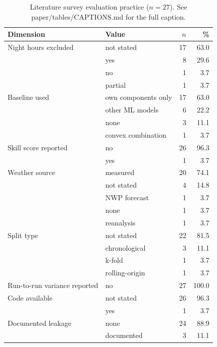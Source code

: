 \begin{table}[t]
  \centering
  \small
  \caption{Literature survey evaluation practice ($n=27$). See paper/tables/CAPTIONS.md for the full caption.}
  \label{tab:survey}
  \begin{tabular}{llrr}
    \toprule
    Dimension & Value & $n$ & \% \\
    \midrule
    Night hours excluded & not stated & 17 & 63.0 \\
     & yes & 8 & 29.6 \\
     & no & 1 & 3.7 \\
     & partial & 1 & 3.7 \\
    \addlinespace
    Baseline used & own components only & 17 & 63.0 \\
     & other ML models & 6 & 22.2 \\
     & none & 3 & 11.1 \\
     & convex combination & 1 & 3.7 \\
    \addlinespace
    Skill score reported & no & 26 & 96.3 \\
     & yes & 1 & 3.7 \\
    \addlinespace
    Weather source & measured & 20 & 74.1 \\
     & not stated & 4 & 14.8 \\
     & NWP forecast & 1 & 3.7 \\
     & none & 1 & 3.7 \\
     & reanalysis & 1 & 3.7 \\
    \addlinespace
    Split type & not stated & 22 & 81.5 \\
     & chronological & 3 & 11.1 \\
     & k-fold & 1 & 3.7 \\
     & rolling-origin & 1 & 3.7 \\
    \addlinespace
    Run-to-run variance reported & no & 27 & 100.0 \\
    \addlinespace
    Code available & not stated & 26 & 96.3 \\
     & yes & 1 & 3.7 \\
    \addlinespace
    Documented leakage & none & 24 & 88.9 \\
     & documented & 3 & 11.1 \\
    \bottomrule
  \end{tabular}
\end{table}
